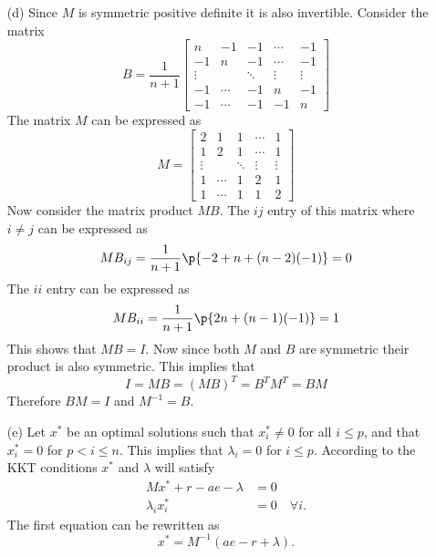 \documentclass[11pt, oneside]{article}
\begin{document}
\begin{enumerate}
\begin{enumerate}
\begin{proof}
        \end{proof}

      \item[(d)] %
        Since $M$ is symmetric positive definite it is also invertible.
        Consider the matrix
        \[
          B = \frac{1}{n+1}
          \begin{bmatrix}
            n & -1 & -1 & \cdots & -1 \\
            -1 & n & -1 & \cdots & -1 \\
            \vdots & & \ddots & \vdots & \vdots \\
            -1 & \cdots & -1 & n & -1 \\
            -1 & \cdots & -1 & -1 & n
          \end{bmatrix}
        \]
        The matrix $M$ can be expressed as
        \[
          M =
          \begin{bmatrix}
            2 & 1 & 1 & \cdots & 1 \\
            1 & 2 & 1 & \cdots & 1 \\
            \vdots & & \ddots & \vdots & \vdots \\
            1 & \cdots & 1 & 2 & 1 \\
            1 & \cdots & 1 & 1 & 2
          \end{bmatrix}
        \]
        Now consider the matrix product $MB$.
        The $ij$ entry of this matrix where $i \neq j$ can be expressed as
        \[
          MB_{ij} = \frac{1}{n+1}\p{-2 + n + (n - 2)(-1)} = 0
        \]
        The $ii$ entry can be expressed as
        \[
          MB_{ii} = \frac{1}{n+1}\p{2n + (n - 1)(-1)} = 1
        \]
        This shows that $MB = I$.
        Now since both $M$ and $B$ are symmetric their product is
        also symmetric.
        This implies that
        \[
          I = MB = (MB)^T = B^T M^T = BM
        \]
        Therefore $BM = I$ and $M^{-1} = B$.

      \item[(e)] %
        Let $x^*$ be an optimal solutions such that $x^*_i \neq 0$ for all $i \le p$, and
        that $x^*_i = 0$ for $p < i \le n$.
        This implies that $\lambda_i = 0$ for $i \le p$.
        According to the KKT conditions $x^*$ and $\lambda$ will satisfy
        \begin{align*}
          Mx^* + r - ae - \lambda &= 0 \\
          \lambda_i x^*_i &= 0 \quad \forall i.
        \end{align*}
        The first equation can be rewritten as
        \[
          x^* = M^{-1}(ae - r + \lambda).
        \]


\end{enumerate}
\end{enumerate}
\end{document}
